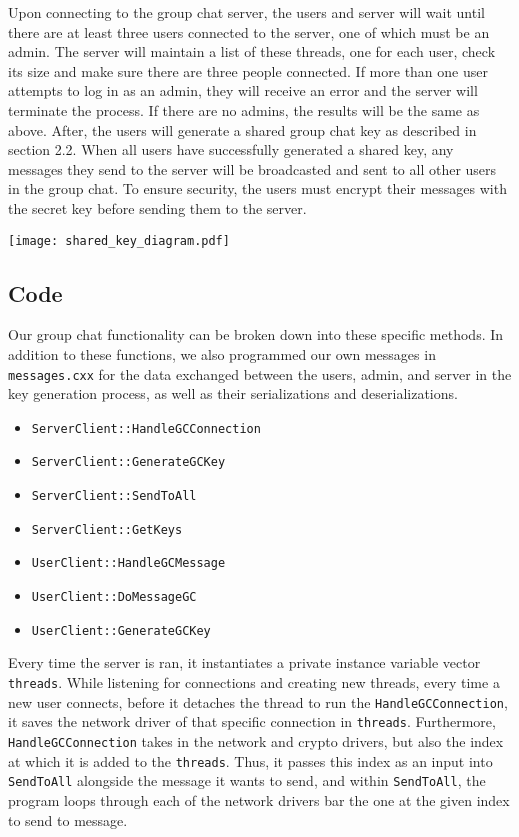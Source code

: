 \documentclass[sigconf]{acmart}
\begin{document}
Upon connecting to the group chat server, the users and server will wait until there are at least three users connected to the server, one of which must be an admin. The server will maintain a list of these threads, one for each user, check its size and make sure there are three people connected. If more than one user attempts to log in as an admin, they will receive an error and the server will terminate the process. If there are no admins, the results will be the same as above. After, the users will generate a shared group chat key as described in section 2.2. When all users have successfully generated a shared key, any messages they send to the server will be broadcasted and sent to all other users in the group chat. To ensure security, the users must encrypt their messages with the secret key before sending them to the server.

\texttt{[image: shared\_key\_diagram.pdf]}

\subsection{Code}

Our group chat functionality can be broken down into these specific methods. In addition to these functions, we also programmed our own messages in \texttt{messages.cxx} for the data exchanged between the users, admin, and server in the key generation process, as well as their serializations and deserializations.   
\begin{itemize}
    \item \texttt{ServerClient::HandleGCConnection}
    \item \texttt{ServerClient::GenerateGCKey}
    \item \texttt{ServerClient::SendToAll}
    \item \texttt{ServerClient::GetKeys}
    \item \texttt{UserClient::HandleGCMessage}
    \item \texttt{UserClient::DoMessageGC}
    \item \texttt{UserClient::GenerateGCKey}
\end{itemize}

Every time the server is ran, it instantiates a private instance variable vector \texttt{threads}. While listening for connections and creating new threads, every time a new user connects, before it detaches the thread to run the \texttt{HandleGCConnection}, it saves the network driver of that specific connection in \texttt{threads}. Furthermore, \texttt{HandleGCConnection} takes in the network and crypto drivers, but also the index at which it is added to the \texttt{threads}. Thus, it passes this index as an input into \texttt{SendToAll} alongside the message it wants to send, and within \texttt{SendToAll}, the program loops through each of the network drivers bar the one at the given index to send to message.
\end{document}
